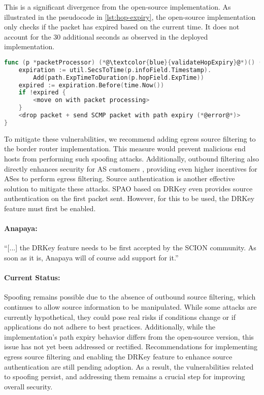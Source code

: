 This is a significant divergence from the open-source implementation.
As illustrated in the pseudocode in \cref{lst:hop-expiry}, the open-source implementation only checks if the packet has expired based on the current time.
It does not account for the 30 additional seconds as observed in the deployed implementation.



\begin{lstlisting}[language={Go}, morekeywords={}, caption={Pseudocode of hop expiry check in open-source implementation of the border router.}, label={lst:hop-expiry}]
func (p *packetProcessor) (*@\textcolor{blue}{validateHopExpiry}@*)() (processResult, error) {
    expiration := util.SecsToTime(p.infoField.Timestamp).
        Add(path.ExpTimeToDuration(p.hopField.ExpTime))
    expired := expiration.Before(time.Now())
    if !expired {
        <move on with packet processing>
    }
    <drop packet + send SCMP packet with path expiry (*@error@*)>
}
\end{lstlisting}


To mitigate these vulnerabilities, we recommend adding egress source filtering to the border router implementation.
This measure would prevent malicious end hosts from performing such spoofing attacks.
Additionally, outbound filtering also directly enhances security for AS customers \cite[Section 7.7.3]{Perrig2022}, providing even higher incentives for ASes to perform egress filtering.
Source authentication is another effective solution to mitigate these attacks.
SPAO based on DRKey even provides source authentication on the first packet sent.
However, for this to be used, the DRKey feature must first be enabled.

\begin{boxH}
    \paragraph{Anapaya:}
    ``[...] the DRKey feature needs to be first accepted by the SCION community. As soon as it is, Anapaya will of course add support for it.''
\end{boxH}


\paragraph{Current Status:}
Spoofing remains possible due to the absence of outbound source filtering, which continues to allow source information to be manipulated.
While some attacks are currently hypothetical, they could pose real risks if conditions change or if applications do not adhere to best practices.
Additionally, while the implementation's path expiry behavior differs from the open-source version, this issue has not yet been addressed or rectified.
Recommendations for implementing egress source filtering and enabling the DRKey feature to enhance source authentication are still pending adoption.
As a result, the vulnerabilities related to spoofing persist, and addressing them remains a crucial step for improving overall security.


